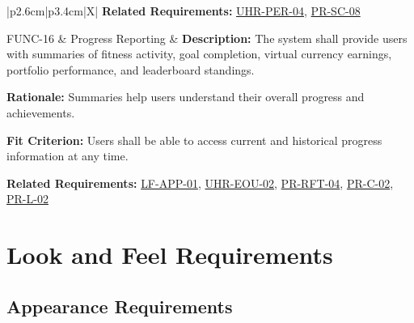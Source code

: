 \documentclass[12pt]{article}
\begin{document}
\begin{xltabular}{\textwidth}{|p{2.6cm}|p{3.4cm}|X|}
\textbf{Related Requirements:} \hyperlink{req:UHR-PER-04}{UHR-PER-04}, \hyperlink{req:PR-SC-08}{PR-SC-08}\\
\hline

FUNC-16\hypertarget{req:FUNC-16}{} & 
Progress Reporting & 
\textbf{Description:} The system shall provide users with summaries of fitness activity, goal completion, virtual currency earnings, portfolio performance, and leaderboard standings.

\textbf{Rationale:} Summaries help users understand their overall progress and achievements.

\textbf{Fit Criterion:} Users shall be able to access current and historical progress information at any time.

\textbf{Related Requirements:} \hyperlink{req:LF-APP-01}{LF-APP-01}, \hyperlink{req:UHR-EOU-02}{UHR-EOU-02}, \hyperlink{req:PR-RFT-04}{PR-RFT-04}, \hyperlink{req:PR-C-02}{PR-C-02}, \hyperlink{req:PR-L-02}{PR-L-02}\\
\hline

\end{xltabular}

\section{Look and Feel Requirements}
\subsection{Appearance Requirements}
\end{document}
